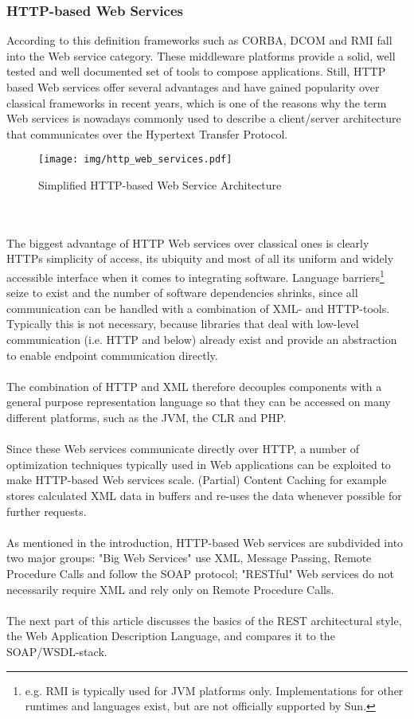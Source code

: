 \subsubsection{HTTP-based Web Services}
According to this definition frameworks such as CORBA, DCOM and RMI fall into the Web service category. These middleware platforms provide a solid, well tested and well documented set of tools to compose applications. Still, HTTP based Web services offer several advantages and have gained popularity over classical frameworks in recent years, which is one of the reasons why the term Web services is nowadays commonly used to describe a client/server architecture that communicates over the Hypertext Transfer Protocol.
\begin{figure}[htp]
\centering
\texttt{[image: img/http\_web\_services.pdf]}
\caption{Simplified HTTP-based Web Service Architecture}\label{fig:erptsqfit}
\end{figure}
\\ \\
The biggest advantage of HTTP Web services over classical ones is clearly HTTPs simplicity of access, its ubiquity and most of all its uniform and widely accessible interface when it comes to integrating software. Language barriers\footnote{e.g. RMI is typically used for JVM platforms only. Implementations for other runtimes and languages exist, but are not officially supported by Sun.} seize to exist and the number of software dependencies shrinks, since all communication can be handled with a combination of XML- and HTTP-tools. Typically this is not necessary, because libraries that deal with low-level communication (i.e. HTTP and below) already exist and provide an abstraction to enable endpoint communication directly.
\\ \\
The combination of HTTP and XML therefore decouples components with a general purpose representation language so that they can be accessed on many different platforms, such as the JVM, the CLR and PHP.
\\ \\
Since these Web services communicate directly over HTTP, a number of optimization techniques typically used in Web applications can be exploited to make HTTP-based Web services scale. (Partial) Content Caching for example stores calculated XML data in buffers and re-uses the data whenever possible for further requests.
\\ \\
As mentioned in the introduction, HTTP-based Web services are subdivided into two major groups: "Big Web Services" use XML, Message Passing, Remote Procedure Calls and follow the SOAP protocol; "RESTful" Web services do not necessarily require XML and rely only on Remote Procedure Calls. 
\\ \\
The next part of this article discusses the basics of the REST architectural style, the Web Application Description Language, and compares it to the SOAP/WSDL-stack.